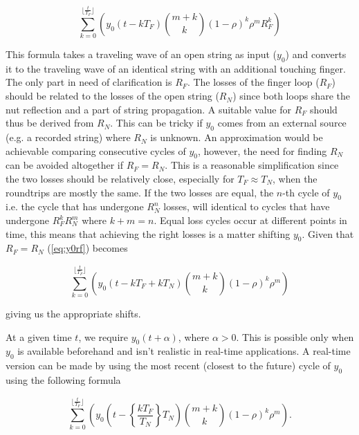 \documentclass{sigchi}
\begin{document}
\begin{equation} \label{eq:y0rf}
	\sum_{k=0}^{\lfloor \frac{t}{T_F} \rfloor}\left(y_0(t - kT_F)\binom{m+k}{k} (1 - \rho)^{k} \rho^mR_F^k\right)
\end{equation}

This formula takes a traveling wave of an open string as input ($y_0$) and converts it to the traveling wave of an identical string with an additional touching finger. The only part in need of clarification is $R_F$. The losses of the finger loop ($R_F$) should be related to the losses of the open string ($R_N$) since both loops share the nut reflection and a part of string propagation. A suitable value for $R_F$ should thus be derived from $R_N$. This can be tricky if $y_0$ comes from an external source (e.g. a recorded string) where $R_N$ is unknown. An approximation would be achievable comparing consecutive cycles of $y_0$, however, the need for finding $R_N$ can be avoided altogether if $R_F = R_N$. This is a reasonable simplification since the two losses should be relatively close, especially for $T_F \approx T_N$, when the roundtrips are mostly the same. If the two losses are equal, the $n$-th cycle of $y_0$ i.e. the cycle that has undergone $R_N^n$ losses, will identical to cycles that have undergone $R_F^kR_N^m$ where $k+m=n$. Equal loss cycles occur at different points in time, this means that achieving the right losses is a matter shifting $y_0$. Given that $R_F = R_N$ (\ref{eq:y0rf}) becomes

\begin{equation} \label{eq:y0}
	\sum_{k=0}^{\lfloor \frac{t}{T_F} \rfloor}\left(y_0(t - kT_F + kT_N)\binom{m+k}{k} (1 - \rho)^{k} \rho^m\right)
\end{equation}

giving us the appropriate shifts.

At a given time $t$, we require $y_0(t+\alpha)$, where $\alpha>0$. This is possible only when $y_0$ is available beforehand and isn't realistic in real-time applications. A real-time version can be made by using the most recent (closest to the future) cycle of $y_0$ using the following formula


\begin{equation}
	\sum_{k=0}^{\lfloor \frac{t}{T_F} \rfloor}\left(y_0(t - \left\{ \frac{kT_F}{T_N}\right\} T_N) \binom{m+k}{k} (1 - \rho)^{k} \rho^m\right).
\end{equation}

\end{document}
